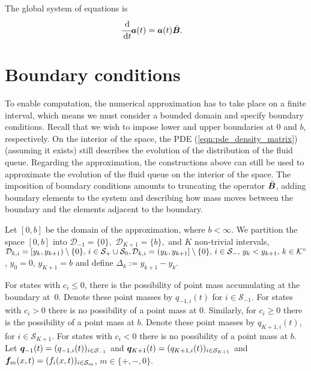 The global system of equations is 
\begin{align}\label{eqn:DG ODE}
	&\cfrac{\, \mathrm{d}}{\, \mathrm{d} t} \boldsymbol a(t) = \boldsymbol a(t){\ddot{{\boldsymbol B}}}.
\end{align}

\section{Boundary conditions}\label{subsec: boundary DG}
To enable computation, the numerical approximation has to take place on a finite interval, which means we must consider a bounded domain and specify boundary conditions. Recall that we wish to impose lower and upper boundaries at \(0\) and \(b\), respectively. On the interior of the space, the PDE (\ref{eqn:pde_density_matrix}) (assuming it exists) still describes the evolution of the distribution of the fluid queue. Regarding the approximation, the constructions above can still be used to approximate the evolution of the fluid queue on the interior of the space. The imposition of boundary conditions amounts to truncating the operator \(\ddot{\boldsymbol B}\), adding boundary elements to the system and describing how mass moves between the boundary and the elements adjacent to the boundary.  %

Let $[0,b]$ be the domain of the approximation, where $b < \infty$. We partition the space $[0,b]$ into \(\mathcal D_{-1}=\{0\},\) \(\mathcal D_{K+1}=\{b\},\) and \(K\) non-trivial intervals, \(\mathcal{D}_{k,i}=[y_k,y_{k+1})\setminus \{0\},\,i\in\mathcal{S}_+\cup\mathcal{S}_0,\mathcal{D}_{k,i}=(y_k,y_{k+1}]\setminus \{0\},\,i\in\mathcal{S}_-,\, y_k<y_{k+1},\, k\in\mathcal K^\circ\), \(y_0=0,\,y_{K+1}=b\) and define \(\Delta_k := y_{k+1}-y_k\). 

For states with \(c_i\leq 0\), there is the possibility of point mass accumulating at the boundary at~\(0\). Denote these point masses by \(q_{{-1},i}(t)\) for \(i\in\mathcal S_{-1}\). For states with \(c_i>0\) there is no possibility of a point mass at \(0\). Similarly, for \(c_i\geq 0\) there is the possibility of a point mass at \(b\). Denote these point masses by \(q_{{K+1},i}(t)\), for \(i\in\mathcal S_{K+1}\). For states with \(c_i<0\) there is no possibility of a point mass at \(b\). Let \(\boldsymbol q_{-1}(t)=(q_{{-1},i}(t))_{i\in\mathcal{S}_{-1}}\) and \(\boldsymbol q_{K+1}(t) = (q_{{K+1},i}(t))_{i\in\mathcal{S}_{K+1}}\) and \(\boldsymbol f_m(x,t) = (f_i(x,t))_{i\in\mathcal{S}_m}\), \(m\in\{+,-,0\}\). 


